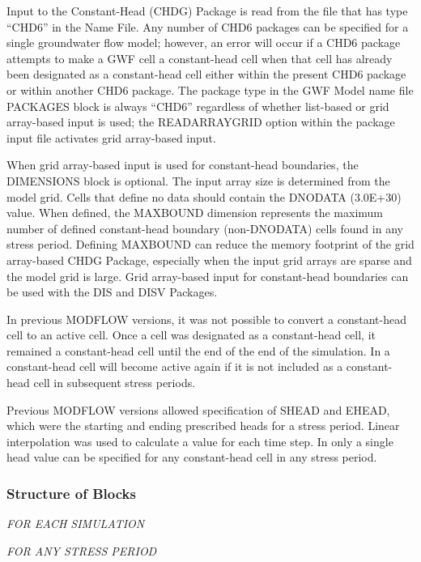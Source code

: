 
Input to the Constant-Head (CHDG) Package is read from the file that has type ``CHD6'' in the Name File.  Any number of CHD6 packages can be specified for a single groundwater flow model; however, an error will occur if a CHD6 package attempts to make a GWF cell a constant-head cell when that cell has already been designated as a constant-head cell either within the present CHD6 package or within another CHD6 package.  The package type in the GWF Model name file PACKAGES block is always ``CHD6'' regardless of whether list-based or grid array-based input is used; the READARRAYGRID option within the package input file activates grid array-based input.

When grid array-based input is used for constant-head boundaries, the DIMENSIONS block is optional.  The input array size is determined from the model grid.  Cells that define no data should contain the DNODATA (3.0E+30) value.  When defined, the MAXBOUND dimension represents the maximum number of defined constant-head boundary (non-DNODATA) cells found in any stress period.  Defining MAXBOUND can reduce the memory footprint of the grid array-based CHDG Package, especially when the input grid arrays are sparse and the model grid is large.  Grid array-based input for constant-head boundaries can be used with the DIS and DISV Packages.

In previous MODFLOW versions, it was not possible to convert a constant-head cell to an active cell.  Once a cell was designated as a constant-head cell, it remained a constant-head cell until the end of the end of the simulation.  In \mf a constant-head cell will become active again if it is not included as a constant-head cell in subsequent stress periods.

Previous MODFLOW versions allowed specification of SHEAD and EHEAD, which were the starting and ending prescribed heads for a stress period.  Linear interpolation was used to calculate a value for each time step.  In \mf only a single head value can be specified for any constant-head cell in any stress period.

\vspace{5mm}
\subsubsection{Structure of Blocks}
\vspace{5mm}

\noindent \textit{FOR EACH SIMULATION}


\vspace{5mm}
\noindent \textit{FOR ANY STRESS PERIOD}


